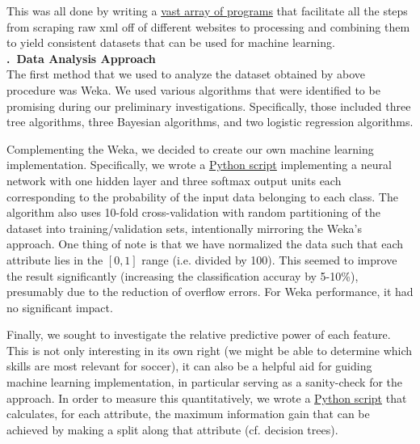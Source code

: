 \documentclass[a4paper,11pt,table]{article}
\renewcommand{\section}[1]{\stepcounter{section}\noindent\textbf{\arabic{section}.~#1}\\}
\begin{document}
This was all done by writing a \href{https://github.com/TheLordBlarg/Soccer_Success/tree/master/codes/data_processing}{vast array of programs} that facilitate all the steps from scraping raw xml off of different websites to processing and combining them to yield consistent datasets that can be used for machine learning.
~\\
\section{Data Analysis Approach}

The first method that we used to analyze the dataset obtained by above procedure was Weka. We used various algorithms that were identified to be promising during our preliminary investigations. Specifically, those included three tree algorithms, three Bayesian algorithms, and two logistic regression algorithms.

Complementing the Weka, we decided to create our own machine learning implementation. Specifically, we wrote a \href{https://github.com/TheLordBlarg/Soccer_Success/blob/master/codes/machine_learning/msc_nn_hpc.py}{Python script} implementing a neural network with one hidden layer and three softmax output units each corresponding to the probability of the input data belonging to each class. The algorithm also uses 10-fold cross-validation with random partitioning of the dataset into training/validation sets, intentionally mirroring the Weka's approach. One thing of note is that we have normalized the data such that each attribute lies in the $[0,1]$ range (i.e. divided by 100). This seemed to improve the result significantly (increasing the classification accuray by 5-10\%), presumably due to the reduction of overflow errors. For Weka performance, it had no significant impact.

Finally, we sought to investigate the relative predictive power of each feature. This is not only interesting in its own right (we might be able to determine which skills are most relevant for soccer), it can also be a helpful aid for guiding machine learning implementation, in particular serving as a sanity-check for the approach. In order to measure this quantitatively, we wrote a \href{https://github.com/TheLordBlarg/Soccer_Success/blob/master/codes/feature_analysis/info_entropy.py}{Python script} that calculates, for each attribute, the maximum information gain that can be achieved by making a split along that attribute (cf. decision trees). \\
~\\
\end{document}
